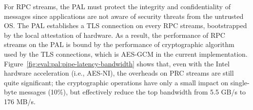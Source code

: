 For RPC streams,
the \sgx{} PAL must protect the integrity and confidentiality of messages since applications
are not aware of security threats from the untrusted OS.
The \sgx{} PAL establishes a TLS connection
on every RPC streams,
bootstrapped by the local attestation of \sgx{} hardware.
As a result,
the performance of RPC streams on the \sgx{} PAL
is bound by the performance
of cryptographic algorithm used by the TLS connections,
which is AES-GCM in the current implementation.
Figure~\ref{fig:eval:pal:pipe-latency-bandwidth}
shows that, even with the Intel hardware acceleration (i.e., AES-NI),
the overheads on PRC streams are still
quite significant;
the cryptographic operations have only a small impact on single-byte messages (\roughly{}10\%),
but effectively reduce the top bandwidth from \roughly{}5.5 GB/s
to \roughly{}176 MB/s.







